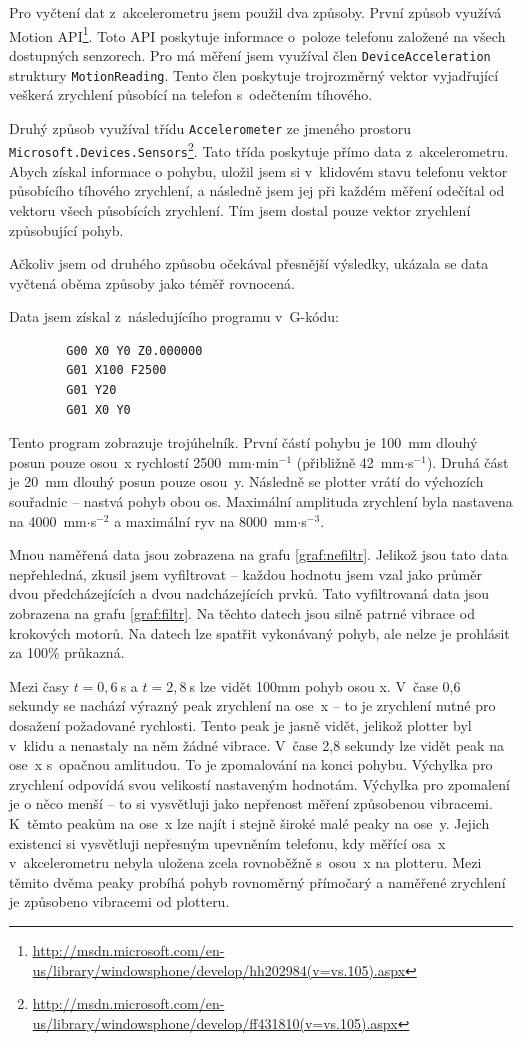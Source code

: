 	Pro vyčtení dat z~akcelerometru jsem použil dva způsoby. První způsob využívá Motion API\footnote{\url{http://msdn.microsoft.com/en-us/library/windowsphone/develop/hh202984(v=vs.105).aspx}}. Toto API poskytuje informace o~poloze telefonu založené na všech dostupných senzorech. Pro má měření jsem využíval člen {\tt DeviceAcceleration} struktury {\tt MotionReading}. Tento člen poskytuje trojrozměrný vektor vyjadřující veškerá zrychlení působící na telefon s~odečtením tíhového.
	
	Druhý způsob využíval třídu {\tt Accelerometer} ze jmeného prostoru {\tt Microsoft.Devices.Sensors}\footnote{\url{http://msdn.microsoft.com/en-us/library/windowsphone/develop/ff431810(v=vs.105).aspx}}. Tato třída poskytuje přímo data z~akcelerometru. Abych získal informace o pohybu, uložil jsem si v~klidovém stavu telefonu vektor působícího tíhového zrychlení, a následně jsem jej při každém měření odečítal od vektoru všech působících zrychlení. Tím jsem dostal pouze vektor zrychlení způsobující pohyb.
	
	Ačkoliv jsem od druhého způsobu očekával přesnější výsledky, ukázala se data vyčtená oběma způsoby jako téměř rovnocená.
	
	Data jsem získal z~následujícího programu v~G-kódu:
	\begin{verbatim}
		G00 X0 Y0 Z0.000000
		G01 X100 F2500
		G01 Y20
		G01 X0 Y0
	\end{verbatim}
	Tento program zobrazuje trojúhelník. První částí pohybu je 100~mm dlouhý posun pouze osou~x rychlostí 2500~mm$\cdot$min$^{-1}$ (přibližně 42~mm$\cdot$s$^{-1}$). Druhá část je 20~mm dlouhý posun pouze osou~y. Následně se plotter vrátí do výchozích souřadnic -- nastvá pohyb obou os. Maximální amplituda zrychlení byla nastavena na 4000~mm$\cdot$s$^{-2}$ a maximální ryv na 8000~mm$\cdot$s$^{-3}$.
	
	Mnou naměřená data jsou zobrazena na grafu \ref{graf:nefiltr}. Jelikož jsou tato data nepřehledná, zkusil jsem vyfiltrovat -- každou hodnotu jsem vzal jako průměr dvou předcházejících a dvou nadcházejících prvků. Tato vyfiltrovaná data jsou zobrazena na grafu \ref{graf:filtr}. Na těchto datech jsou silně patrné vibrace od krokových motorů. Na datech lze spatřit vykonávaný pohyb, ale nelze je prohlásit za 100\% průkazná.
	
	Mezi časy $t=0,6~$s a $t=2,8~$s lze vidět 100mm pohyb osou x. V~čase 0,6 sekundy se nachází výrazný peak zrychlení na ose~x -- to je zrychlení nutné pro dosažení požadované rychlosti. Tento peak je jasně vidět, jelikož plotter byl v~klidu a nenastaly na něm žádné vibrace. V~čase 2,8 sekundy lze vidět peak na ose~x s~opačnou amlitudou. To je zpomalování na konci pohybu. Výchylka pro zrychlení odpovídá svou velikostí nastaveným hodnotám. Výchylka pro zpomalení je o něco menší -- to si vysvětluji jako nepřenost měření způsobenou vibracemi. K~těmto peakům na ose~x lze najít i stejně široké malé peaky na ose~y. Jejich existenci si vysvětluji nepřesným upevněním telefonu, kdy měřící osa~x v~akcelerometru nebyla uložena zcela rovnoběžně s~osou~x na plotteru. Mezi těmito dvěma peaky probíhá pohyb rovnoměrný přímočarý a naměřené zrychlení je způsobeno vibracemi od plotteru.
	
